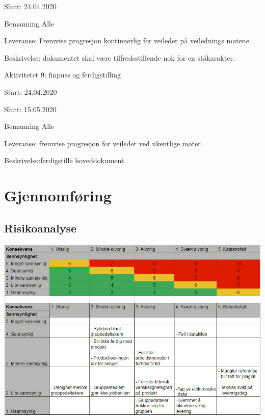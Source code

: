 \documentclass[11pt,a4paper]{report}
\begin{document}
\begin{compactdesc}
\begin{compactitem}
	\item Slutt: 24.04.2020
	\item Bemanning Alle
	\item Leveranse: Fremvise progresjon kontinuerlig for veileder på veilednings møtene. 
	\item Beskrivelse: dokumentet skal være tilfredsstillende nok for en ståkarakter.
	\end{compactitem}
	\item [Aktivitetet 9:] finpuss og ferdigstilling
	\begin{compactitem}
	\item Start: 24.04.2020
	\item Slutt: 15.05.2020
	\item Bemanning Alle
	\item Leveranse: fremvise progresjon for veileder ved ukentlige møter. 
	\item Beskrivelse:ferdigstille hoveddokument.
	\end{compactitem}

\end{compactdesc}

\section*{Gjennomføring}

\subsection*{Risikoanalyse}

\includegraphics[scale=0.75]{ros-analyse}
\end{document}

